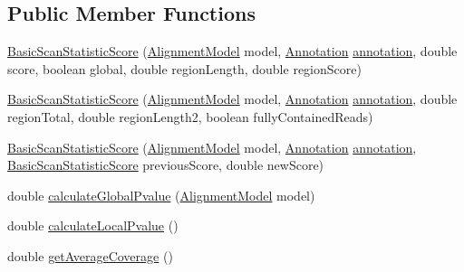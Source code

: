 \subsection*{Public Member Functions}
\begin{DoxyCompactItemize}
\item 
\hyperlink{classumms_1_1core_1_1model_1_1score_1_1_basic_scan_statistic_score_a0f23700e5bf6d7b275ee75acef2f64b3}{Basic\+Scan\+Statistic\+Score} (\hyperlink{classumms_1_1core_1_1model_1_1_alignment_model}{Alignment\+Model} model, \hyperlink{interfaceumms_1_1core_1_1annotation_1_1_annotation}{Annotation} \hyperlink{classumms_1_1core_1_1model_1_1score_1_1_window_score_1_1_abstract_window_score_a455fb02f18f492e611113b9da0a24888}{annotation}, double score, boolean global, double region\+Length, double region\+Score)
\item 
\hyperlink{classumms_1_1core_1_1model_1_1score_1_1_basic_scan_statistic_score_ac8d64a938b7a0fff1924a8c32f694b13}{Basic\+Scan\+Statistic\+Score} (\hyperlink{classumms_1_1core_1_1model_1_1_alignment_model}{Alignment\+Model} model, \hyperlink{interfaceumms_1_1core_1_1annotation_1_1_annotation}{Annotation} \hyperlink{classumms_1_1core_1_1model_1_1score_1_1_window_score_1_1_abstract_window_score_a455fb02f18f492e611113b9da0a24888}{annotation}, double region\+Total, double region\+Length2, boolean fully\+Contained\+Reads)
\item 
\hyperlink{classumms_1_1core_1_1model_1_1score_1_1_basic_scan_statistic_score_ab310d3d88e1ebd8dbae7ccafaab44ce6}{Basic\+Scan\+Statistic\+Score} (\hyperlink{classumms_1_1core_1_1model_1_1_alignment_model}{Alignment\+Model} model, \hyperlink{interfaceumms_1_1core_1_1annotation_1_1_annotation}{Annotation} \hyperlink{classumms_1_1core_1_1model_1_1score_1_1_window_score_1_1_abstract_window_score_a455fb02f18f492e611113b9da0a24888}{annotation}, \hyperlink{classumms_1_1core_1_1model_1_1score_1_1_basic_scan_statistic_score}{Basic\+Scan\+Statistic\+Score} previous\+Score, double new\+Score)
\item 
double \hyperlink{classumms_1_1core_1_1model_1_1score_1_1_basic_scan_statistic_score_a4f291022ecc0497ec100456fec710ec0}{calculate\+Global\+Pvalue} (\hyperlink{classumms_1_1core_1_1model_1_1_alignment_model}{Alignment\+Model} model)
\item 
double \hyperlink{classumms_1_1core_1_1model_1_1score_1_1_basic_scan_statistic_score_a578eff1fcf43c1bc8d8079c7563d4e6d}{calculate\+Local\+Pvalue} ()
\item 
double \hyperlink{classumms_1_1core_1_1model_1_1score_1_1_basic_scan_statistic_score_aeb57f75075173202d9b7e0520c566cdd}{get\+Average\+Coverage} ()

\end{DoxyCompactItemize}
